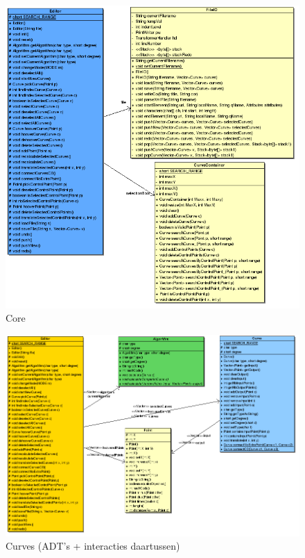 \documentclass[a4paper,11pt,oneside, titlepage]{article}
\begin{document}
\begin{figure}[htbp]
\centering
\includegraphics[scale=0.42]{./UML2/Core.png}
\caption{Core}\label{iCore}
\end{figure}
\begin{figure}[htbp]
\centering
\includegraphics[scale=0.5]{./UML2/Gen.png}
\caption{Curves (ADT's + interacties daartussen)}\label{iCurv}
\end{figure}
\end{document}

